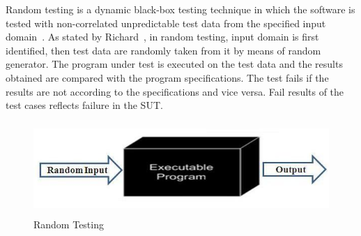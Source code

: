 Random testing is a dynamic black-box testing technique in which the software is tested with non-correlated unpredictable test data from the specified input domain~\cite{Chan2002}. As stated by Richard~\cite{hamlet1994}, in random testing, input domain is first identified, then test data are randomly taken from it by means of random generator. The program under test is executed on the test data and the results obtained are compared with the program specifications. The test fails if the results are not according to the specifications and vice versa. Fail results of the test cases reflects failure in the SUT.

\begin{figure}[h]
	\centering
	\includegraphics[width=13cm, height=3.5cm ]{chapter3/randomTesting.jpg}
	\caption{Random Testing}
\end{figure}

